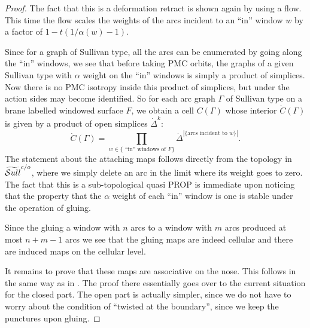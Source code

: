 \documentclass[10pt,a4paper]{amsart}
\def\wSull{\widetilde{\rm {\mathcal S}ull}^{\rm c/o}}
\begin{document}
\begin{proof}
The fact that this is a deformation retract is shown again by using a f\/low. This time the f\/low
scales the weights of the arcs incident to an ``in'' window  $w$ by a factor of $1-t(1/\alpha(w)-1)$.

Since for a graph of Sullivan type, all the arcs can be enumerated
by going along the ``in'' windows, we see that before taking PMC
orbits, the graphs of a given Sullivan type with $\alpha$ weight on
the ``in'' windows is simply a product of simplices. Now there is no
PMC isotropy inside this product of simplices, but under the action
sides may become identif\/ied. So for each arc graph $\Gamma$  of
Sullivan type on a brane labelled windowed surface $F$, we obtain a
cell $C(\Gamma)$ whose interior $\dot C(\Gamma)$ is given by a
product of open simplices $\dot\Delta^k$:
\begin{equation*}
\dot  C(\Gamma) =\prod_{w \in \{\text{ ``in'' windows of $F$\}}} \dot\Delta^{|\{\text{arcs incident to $w$}\}|}.
\end{equation*}
The statement about the attaching maps follows directly from the topology in $\wSull$,
where we simply delete
an arc in the limit where its weight goes to zero.
The fact that this is a sub-topological quasi PROP is immediate upon
noticing that the property that the $\alpha$ weight of each ``in'' window is  one is stable under the operation of gluing.

Since the gluing a window with $n$ arcs to a window with $m$ arcs produced at most $n+m-1$ arcs
we see that the gluing maps are indeed cellular and there are induced maps on the cellular level.

It remains to prove that these maps are associative on the nose. This follows in the same way as in \cite[Theorem~5.33]{hoch1}.
The proof there essentially goes over to the current situation for the closed part. The open part is actually simpler,
since we do not have to worry about the condition of ``twisted at the boundary'', since we keep the punctures
upon gluing.
\end{proof}
\end{document}
